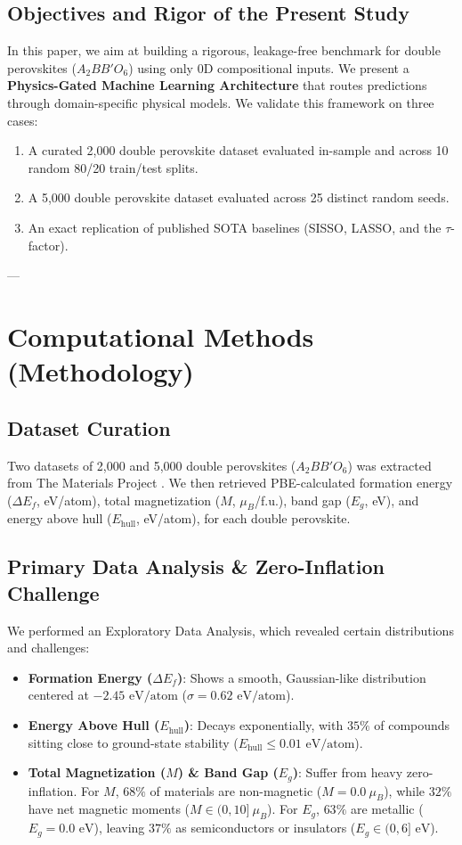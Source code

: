 \documentclass[12pt,onecolumn]{elsarticle}
\begin{document}
\subsection{Objectives and Rigor of the Present Study}
In this paper, we aim at building a rigorous, leakage-free benchmark for double perovskites ($A_2BB'O_6$) using only 0D compositional inputs. We present a \textbf{Physics-Gated Machine Learning Architecture} that routes predictions through domain-specific physical models. We validate this framework on three cases:
\begin{enumerate}
\item A curated 2,000 double perovskite dataset evaluated in-sample and across 10 random 80/20 train/test splits.
\item A 5,000 double perovskite dataset evaluated across 25 distinct random seeds.
\item An exact replication of published SOTA baselines (SISSO, LASSO, and the $\tau$-factor).
\end{enumerate}

---

\section{Computational Methods (Methodology)}

\subsection{Dataset Curation}
Two datasets of 2,000 and 5,000 double perovskites ($A_2BB'O_6$) was extracted from The Materials Project \cite{materialsproject}. We then retrieved PBE-calculated formation energy ($\Delta E_f$, eV/atom), total magnetization ($M$, $\mu_B$/f.u.), band gap ($E_g$, eV), and energy above hull ($E_{\text{hull}}$, eV/atom), for each double perovskite.

\subsection{Primary Data Analysis \& Zero-Inflation Challenge}
We performed an Exploratory Data Analysis, which revealed certain distributions and challenges:
\begin{itemize}
\item \textbf{Formation Energy ($\Delta E_f$)}: Shows a smooth, Gaussian-like distribution centered at $-2.45\text{ eV/atom}$ ($\sigma = 0.62\text{ eV/atom}$).
\item \textbf{Energy Above Hull ($E_{\text{hull}}$)}: Decays exponentially, with $35\%$ of compounds sitting close to ground-state stability ($E_{\text{hull}} \le 0.01\text{ eV/atom}$).
\item \textbf{Total Magnetization ($M$) \& Band Gap ($E_g$)}: Suffer from heavy zero-inflation. For $M$, $68\%$ of materials are non-magnetic ($M = 0.0\ \mu_B$), while $32\%$ have net magnetic moments ($M \in (0, 10]\ \mu_B$). For $E_g$, $63\%$ are metallic ($E_g = 0.0\text{ eV}$), leaving $37\%$ as semiconductors or insulators ($E_g \in (0, 6]\text{ eV}$).
\end{itemize}
\end{document}
